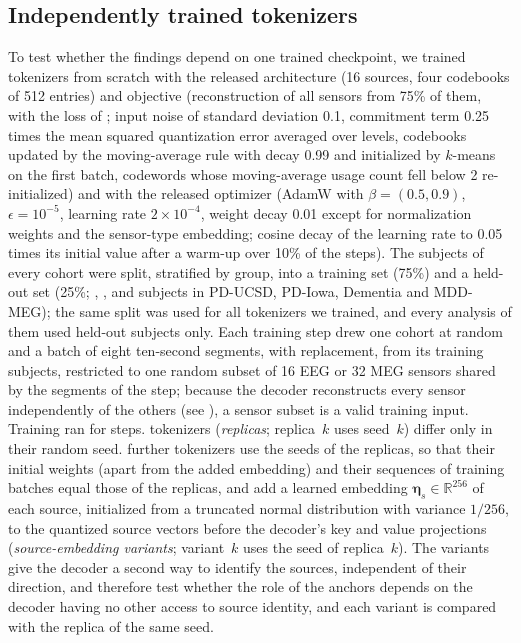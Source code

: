 \documentclass[10pt,letterpaper]{article}
\newcommand{\R}{\mathbb{R}}
\begin{document}
\subsection*{Independently trained tokenizers}\label{sec:methods-replicas}

To test whether the findings depend on one trained checkpoint, we trained tokenizers from
scratch with the released architecture (16 sources, four codebooks of 512 entries) and
objective (reconstruction of all sensors from 75\% of them, with the loss of
; input noise of standard deviation 0.1, commitment term 0.25 times the
mean squared quantization error averaged over levels, codebooks updated by the moving-average
rule with decay 0.99 and initialized by $k$-means on the first batch, codewords whose moving-average
usage count fell below 2 re-initialized) and with the released optimizer (AdamW with $\beta=(0.5,0.9)$,
$\epsilon=10^{-5}$, learning rate $2\times10^{-4}$, weight decay 0.01 except for normalization
weights and the sensor-type embedding; cosine decay of the learning rate to 0.05 times its
initial value after a warm-up over 10\% of the steps). The subjects of every cohort were split,
stratified by group, into a training set (75\%) and a held-out set (25\%; \RepHeldOutUCSD,
\RepHeldOutIowa, \RepHeldOutDementia{} and \RepHeldOutMEG{} subjects in PD-UCSD, PD-Iowa, Dementia
and MDD-MEG); the same split was used for all tokenizers we trained, and every analysis of them
used held-out subjects only. Each training step drew one cohort at random and a batch of eight
ten-second segments, with replacement, from its training subjects, restricted to one random subset
of 16 EEG or 32 MEG sensors shared by the segments of the step; because the decoder reconstructs
every sensor independently of the others (see ), a sensor subset is a valid
training input. Training ran for \ReplicaSteps{} steps. \NumSeedReplicas{} tokenizers
(\emph{replicas}; replica~$k$ uses seed~$k$) differ only in their random seed. \VariantCountCap{} further tokenizers use the seeds of
the replicas, so that their initial weights (apart from the added embedding) and their sequences of
training batches equal those of the replicas, and add a learned embedding $\bm{\eta}_s\in\R^{256}$ of
each source, initialized from a truncated normal distribution with variance $1/256$, to the quantized
source vectors before the decoder's key and value projections (\emph{source-embedding variants};
variant~$k$ uses the seed of replica~$k$). The
variants give the decoder a second way to identify the sources, independent of their direction, and
therefore test whether the role of the anchors depends on the decoder having no other access to
source identity, and each variant is compared with the replica of the same seed.
\end{document}
